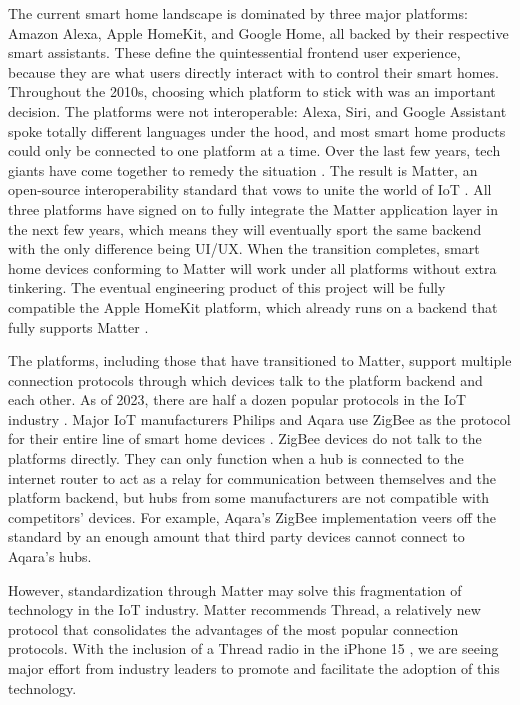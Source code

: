 \documentclass[8pt,twocolumn]{article}
\begin{document}
The current smart home landscape is dominated by three major platforms: Amazon Alexa, Apple HomeKit, and Google Home, all backed by their respective smart assistants. These define the quintessential frontend user experience, because they are what users directly interact with to control their smart homes. Throughout the 2010s, choosing which platform to stick with was an important decision. The platforms were not interoperable: Alexa, Siri, and Google Assistant spoke totally different languages under the hood, and most smart home products could only be connected to one platform at a time. Over the last few years, tech giants have come together to remedy the situation . The result is Matter, an open-source interoperability standard that vows to unite the world of IoT . All three platforms have signed on to fully integrate the Matter application layer in the next few years, which means they will eventually sport the same backend with the only difference being UI/UX. When the transition completes, smart home devices conforming to Matter will work under all platforms without extra tinkering. The eventual engineering product of this project will be fully compatible the Apple HomeKit platform, which already runs on a backend that fully supports Matter \cite{AppleHomekitMatter}.

The platforms, including those that have transitioned to Matter, support multiple connection protocols through which devices talk to the platform backend and each other. As of 2023, there are half a dozen popular protocols in the IoT industry . Major IoT manufacturers Philips and Aqara use ZigBee as the protocol for their entire line of smart home devices \cite{Hue}. ZigBee devices do not talk to the platforms directly. They can only function when a hub is connected to the internet router to act as a relay for communication between themselves and the platform backend, but hubs from some manufacturers are not compatible with competitors' devices. For example, Aqara's ZigBee implementation veers off the standard by an enough amount that third party devices cannot connect to Aqara's hubs.

However, standardization through Matter may solve this fragmentation of technology in the IoT industry. Matter recommends Thread, a relatively new protocol that consolidates the advantages of the most popular connection protocols. With the inclusion of a Thread radio in the iPhone 15 \cite{AppleThreadiPhone15}, we are seeing major effort from industry leaders to promote and facilitate the adoption of this technology.
\end{document}
